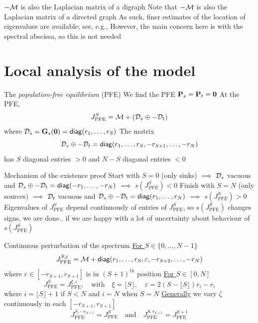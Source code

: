 \documentclass[aspectratio=169]{beamer}
\begin{document}
\begin{frame}{$-\mathcal{M}$ is also the Laplacian matrix of a digraph}
Note that $-\mathcal{M}$ is also the Laplacian matrix of a directed graph
\vfill 
As such, finer estimates of the location of eigenvalues are available; see, e.g.,  \cite{AgaevChebotarev2005}
\vfill
However, the main concern here is with the spectral abscissa, so this is not needed
\end{frame}


\section{Local analysis of the model}
\begin{frame}{The \emph{population-free equilibrium} (PFE)}
	We find the PFE
	$\bP_s=\bP_t=\b0$ 
	\vfill
	At the PFE,
	\begin{equation}\label{eq:J_PFE}
	J_{\textrm{PFE}}^S = \mathcal{M}+(\mathcal{D}_s\oplus -\mathcal{D}_t)
	\end{equation}
	where $\D_s=\bG_s(\b0)=\diag(r_1,\ldots,r_S)$
	\vfill
	The matrix
	\[
	\mathcal{D}_s\oplus -\mathcal{D}_t=\mathsf{diag} (r_1,\ldots,r_S,-r_{S+1},\ldots,-r_N)
	\]
	has $S$ diagonal entries $>0$ and $N-S$ diagonal entries $<0$
\end{frame}


\begin{frame}{Mechanism of the existence proof}
	Start with $S=0$ (only sinks)
	\newline
	$\implies$ $\mathcal{D}_s$ vacuous and $\mathcal{D}_s\oplus -\mathcal{D}_t = \mathsf{diag}(-r_1,\ldots,-r_N)$ \newline
	$\implies$ $s(J_{PFE}^S)<0$
	\vfill
	Finish with $S=N$ (only sources)
	\newline
	$\implies$ $\mathcal{D}_t$ vacuous and $\mathcal{D}_s\oplus -\mathcal{D}_t = \mathsf{diag}(r_1,\ldots,r_N)$ \newline
	$\implies$ $s(J_{PFE}^S)>0$
	\vfill
	Eigenvalues of $J_{\textrm{PFE}}^S$ depend continuously of entries of $J_{\textrm{PFE}}^S$, so $s(J_{\textrm{PFE}}^S)$ changes signs, we are done.. if we are happy with a lot of uncertainty about behaviour of $s(J_{\textrm{PFE}}^S)$
\end{frame}


\begin{frame}{Continuous perturbation of the spectrum}
	\underline{For $S\in\{0,\ldots,N-1\}$}
	\[
	J_{\textrm{PFE}}^{S,\varepsilon} =
	\mathcal{M}+\mathsf{diag}(r_1,\ldots,r_S,\varepsilon,-r_{S+2},\ldots,-r_N)
	\]
	where $\varepsilon\in[-r_{S+1},r_{S+1}]$ is in $(S+1)^{\textrm{th}}$ position
	\vfill
	\underline{For $S\in[0,N]$}
	\begin{equation}\label{eq:xi_epsilon_ri}
	J_{\textrm{PFE}}^{S}=J_{\textrm{PFE}}^{\xi,\varepsilon},
	\quad\textrm{with}\quad
	\xi=\lfloor S\rfloor,
	\quad 
	\varepsilon= 2(S-\lfloor S\rfloor)r_i-r_i
	\end{equation}
	where $i=\lfloor S\rfloor+1$ if $S<N$ and $i=N$ when $S=N$
	\vfill
	\underline{Generally} we vary $\zeta$ continuously in each $[-r_{S+1},r_{S+1}]$
	\[
	J_{\textrm{PFE}}^{S,-r_{S+1}} = J_{\textrm{PFE}}^{S}
	\quad\textrm{and}\quad
	J_{\textrm{PFE}}^{S,r_{S+1}} = J_{\textrm{PFE}}^{S+1}
	\]
\end{frame}
\end{document}

